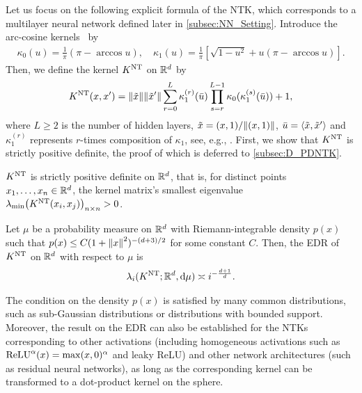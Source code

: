 Let us focus on the following explicit formula of the NTK, which corresponds to a multilayer neural network defined later in \cref{subsec:NN_Setting}.
Introduce the arc-cosine kernels~\citep{cho2009_KernelMethods} by
\begin{align}
  \label{eq:Arccos_Formula}
  \kappa_0(u) =  \frac{1}{\pi}\left( \pi - \arccos u \right),\quad
  \kappa_1(u) = \frac{1}{\pi}\left[ \sqrt {1-u^2} + u (\pi - \arccos u)  \right].
\end{align}
Then, we define the kernel $K^{\mathrm{NT}}$ on $\mathbb{R}^d$ by
\begin{align}
  \label{eq:NTK_Formula}
  K^{\mathrm{NT}}(x,x') =
  \norm{\tilde{x}} \lVert \tilde{x}'\rVert \sum_{r=0}^L \kappa^{(r)}_1(\bar{u}) \prod_{s=r}^{L-1} \kappa_0(\kappa^{(s)}_1(\bar{u})) + 1,
\end{align}
where $L \geq 2$ is the number of hidden layers, $\tilde{x} = (x,1)/\norm{(x,1)}$, $\bar{u} = \left\langle{\tilde{x},\tilde{x}'}\right\rangle$ and $\kappa^{(r)}_1$ represents $r$-times composition of $\kappa_1$,
see, e.g., \citet{jacot2018_NeuralTangent,bietti2020_DeepEquals}.
First, we show that $K^{\mathrm{NT}}$ is strictly positive definite, the proof of which is deferred to \cref{subsec:D_PDNTK}.

\begin{proposition}
  \label{prop:NTK_PD}
  $K^{\mathrm{NT}}$ is strictly positive definite on $\mathbb{R}^d$,
  that is, for distinct points $x_1,\dots,x_n \in \mathbb{R}^d$, the kernel matrix's smallest eigenvalue  $\lambda_{\min}\big(K^{\mathrm{NT}}(x_i,x_j) \big)_{n \times n} > 0$.
\end{proposition}



\begin{theorem}
  \label{thm:NTK_EDR}
  Let $\mu$ be a probability measure on $\mathbb{R}^d$ with Riemann-integrable density $p(x)$ such that $p(x) \leq C (1+\norm{x}^2)^{-(d+3)/2}$
  for some constant $C$.
  Then, the EDR of $K^{\mathrm{NT}}$ on $\mathbb{R}^d$ with respect to $\mu$ is
  \begin{align}
    \lambda_i(K^{\mathrm{NT}};\mathbb{R}^d,\dd \mu) \asymp i^{-\frac{d+1}{d}}.
  \end{align}
\end{theorem}

\begin{remark}
  The condition on the density $p(x)$ is satisfied by many common distributions, such as sub-Gaussian distributions or distributions with bounded support.
  Moreover, the result on the EDR can also be established for the NTKs corresponding to other activations
  (including homogeneous activations such as $\mathrm{ReLU}^\alpha(x) = \max(x,0)^\alpha$ and leaky ReLU)
  and other network architectures (such as residual neural networks),
  as long as the corresponding kernel can be transformed to a dot-product kernel on the sphere.
\end{remark}



